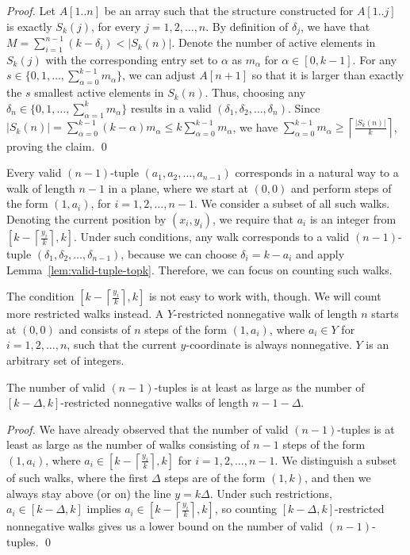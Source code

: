 \documentclass[runningheads]{llncs}
\begin{document}
\begin{proof}
Let $A[1..n]$ be an array such that the structure constructed for
$A[1..j]$ is exactly $S_k(j)$, for every $j=1,2,\ldots,n$. By
definition of $\delta_{j}$, we have that $M =
\sum_{i=1}^{n-1}(k-\delta_{i})< |S_k(n)|$.  Denote the number of
active elements in $S_{k}(j)$ with the corresponding entry set to
$\alpha$ as $m_\alpha$ for $\alpha \in [0,k-1]$. For any $s \in
\{0,1,\ldots, \sum_{\alpha = 0}^{k-1}m_\alpha \}$, we can adjust
$A[n+1]$ so that it is larger than exactly the $s$ smallest active
elements in $S_k(n)$. Thus, choosing any $\delta_{n} \in
\{0,1,\ldots,\sum_{\alpha = 1}^{k}m_\alpha\}$ results in a valid
$(\delta_{1},\delta_{2},\ldots,\delta_{n})$.  Since $|S_k(n)| =
\sum_{\alpha = 0}^{k-1} (k - \alpha)m_\alpha \le k \sum_{\alpha =
  0}^{k-1} m_{\alpha}$, we have $\sum_{\alpha = 0}^{k-1} m_\alpha \geq
\left\lceil\frac{|S_k(n)|}{k}\right\rceil$, proving the claim.  \qed
\end{proof}

Every valid $(n-1)$-tuple $(a_{1},a_{2},\ldots,a_{n-1})$ corresponds
in a natural way to a walk of length $n-1$ in a plane, where we start
at $(0,0)$ and perform steps of the form $(1,a_{i})$, for
$i=1,2,\ldots,n-1$.  We consider a subset of all such walks. Denoting
the current position by $(x_{i},y_{i})$, we require that $a_{i}$ is an
integer from $[k-\left\lceil\frac{y_{i}}{k}\right\rceil,k]$. Under
such conditions, any walk corresponds to a valid $(n-1)$-tuple
$(\delta_{1},\delta_{2},\ldots,\delta_{n-1})$, because we can choose
$\delta_{i} = k - a_{i}$ and apply
Lemma~\ref{lem:valid-tuple-topk}. Therefore, we can focus on counting
such walks.

The condition $[k-\left\lceil\frac{y_{i}}{k}\right\rceil,k]$ is not
easy to work with, though. We will count more restricted walks
instead. A $Y$-restricted nonnegative walk of length $n$ starts at
$(0,0)$ and consists of $n$ steps of the form $(1,a_{i})$, where
$a_{i}\in Y$ for $i=1,2,\ldots,n$, such that the current
$y$-coordinate is always nonnegative. $Y$ is an arbitrary set of
integers.

\begin{lemma}
\label{lem:restricted-walks-topk}
The number of valid $(n-1)$-tuples is at least as large as the number
of $[k -\Delta,k]$-restricted nonnegative walks of length
$n-1-\Delta$.
\end{lemma}

\begin{proof}
We have already observed that the number of valid $(n-1)$-tuples is at
least as large as the number of walks consisting of $n-1$ steps of the
form $(1,a_{i})$, where $a_{i}\in
[k-\left\lceil\frac{y_{i}}{k}\right\rceil,k]$ for
$i=1,2,\ldots,n-1$. We distinguish a subset of such walks, where the
first $\Delta$ steps are of the form $(1,k)$, and then we always stay
above (or on) the line $y=k\Delta$. Under such restrictions, $a_{i}\in
[k-\Delta,k]$ implies $a_{i}\in
[k-\left\lceil\frac{y_{i}}{k}\right\rceil,k]$, so counting
$[k-\Delta,k]$-restricted nonnegative walks gives us a lower bound on
the number of valid $(n-1)$-tuples.  \qed
\end{proof}
\end{document}

